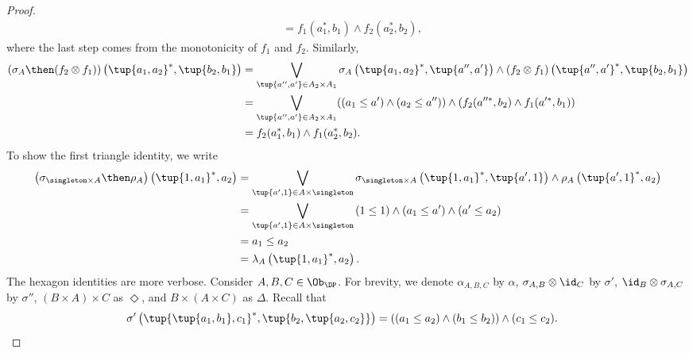 {\begin{proof}
\begin{equation}
\begin{aligned}
           &= f_1(a_1^*,b_1) \wedge f_2(a_2^*,b_2),
        \end{aligned}
    \end{equation}
    where the last step comes from the monotonicity of $f_1$ and $f_2$. Similarly,
    \begin{equation}
        \begin{aligned}
           \left( \sigma_A \then (f_2\otimes f_1)\right)\left( \tup{a_1,a_2}^*,\tup{b_2,b_1}\right)&=\bigvee_{\tup{a'',a'}\in A_2\times A_1}\sigma_A\left(\tup{a_1,a_2}^*,\tup{a'',a'} \right)\wedge \left(f_2\otimes f_1\right) \left( \tup{a'',a'}^*,\tup{b_2,b_1}\right)\\
           &=\bigvee_{\tup{a'',a'}\in A_2\times A_1}(\left(a_1\leq a'\right)\wedge \left(a_2\leq a''\right)) \wedge (f_2(a''^*,b_2)\wedge f_1(a'^*,b_1))\\
           &= f_2(a_1^*,b_1) \wedge f_1(a_2^*,b_2).
        \end{aligned}
    \end{equation}
    To show the first triangle identity, we write
    \begin{equation}
        \begin{aligned}
           \left(\sigma_{\singleton \times A}\then \rho_A\right)\left( \tup{1,a_1}^*,a_2\right)&=\bigvee_{\tup{a',1}\in A\times \singleton}\sigma_{\singleton \times A}\left( \tup{1,a_1}^*,\tup{a',1}\right)\wedge \rho_A\left( \tup{a',1}^*,a_2\right)\\
           &=\bigvee_{\tup{a',1}\in A\times \singleton} \left(1\leq 1\right) \wedge \left(a_1\leq a'\right)\wedge \left(a'\leq a_2\right)\\
           &=a_1\leq a_2\\
           &=\lambda_A\left( \tup{1,a_1}^*,a_2\right).
        \end{aligned}
    \end{equation}
    The hexagon identities are more verbose. Consider $A,B,C\in \Ob_\DP$. For brevity, we denote $\alpha_{A,B,C}$ by $\alpha$, $\sigma_{A,B}\otimes \id_C$ by $\sigma'$, $\id_B \otimes \sigma_{A,C}$ by $\sigma''$, $(B\times A)\times C$ as $\Diamond$, and $B\times (A\times C)$ as $\Delta$. Recall that
    \begin{equation}
        \begin{aligned}
            \sigma' \left(\tup{\tup{a_1,b_1},c_1}^*,\tup{b_2,\tup{a_2,c_2}} \right)&=\left( (a_1\leq a_2)  \wedge (b_1\leq b_2)\right)\wedge (c_1\leq c_2).
        \end{aligned}
    \end{equation}

\end{proof}}
